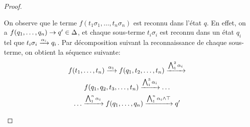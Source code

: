 \begin{proof}
\begin{itemize}
  On  observe que le terme $f(t_1\sigma_1,\dots, t_n\sigma_n)$ est reconnu dans l'état $q$. En effet, on a  $f(q_1,\dots, q_n) \rightarrow q' \in \Delta$, et chaque sous-terme
  $t_i\sigma_i$ est reconnu dans un état $q_i$ tel que $t_i\sigma_i \xrightarrow{\alpha_i} q_i$. 
  Par décomposition suivant la reconnaissance de chaque sous-terme, on obtient la séquence suivante:
  \begin{multline*}
    \label{eq:1}
    f(t_1,\dots, t_n) \xrightarrow{\alpha_1} f(q_1, t_2, \dots, t_n) \xrightarrow{\bigwedge_1^2 \alpha_i} \\
    f(q_1, q_2, t_3, \dots, t_n) \xrightarrow{\bigwedge_1^3 \alpha_i} \dots \\
    \dots \xrightarrow{\bigwedge_1^n\alpha_i} f(q_1,\dots, q_n) \xrightarrow{\bigwedge_1^n \alpha_i \land \top} q'
  \end{multline*}


\end{itemize}
\end{proof}
